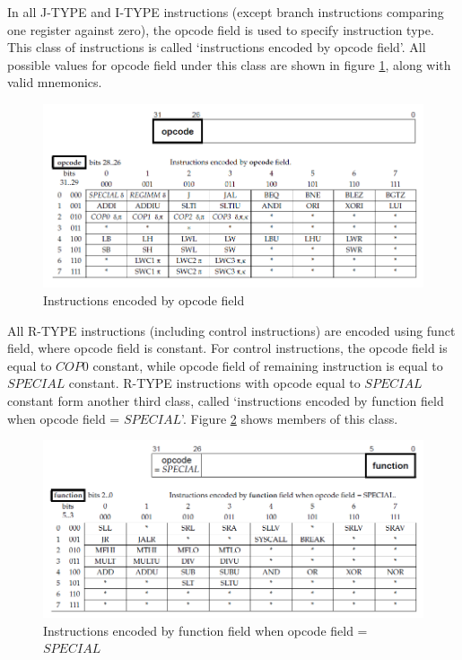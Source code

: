 \documentclass[oneside]{book}
\begin{document}
In all J-TYPE and I-TYPE instructions
(except branch instructions comparing one register against zero),
the opcode field is used to specify instruction type. This class
of instructions is called `instructions encoded by opcode field'.
All possible values for opcode field under this class are shown
in figure \ref{encoding1}, along with valid mnemonics.\\

\begin{figure}[H]
\begin{center}
\includegraphics[width=\textwidth]{encoding1.png}
\end{center}
\caption{Instructions encoded by opcode field}
\label{encoding1}
\end{figure}

All R-TYPE instructions (including control instructions)
are encoded using funct field, where opcode field is constant.
For control instructions, the opcode field is equal to $COP0$ constant,
while opcode field of remaining instruction is equal to $SPECIAL$ constant.
R-TYPE instructions with opcode equal to $SPECIAL$ constant form
another third class, called `instructions encoded by function field
when opcode field = $SPECIAL$'. Figure \ref{encoding2} shows
members of this class.\\

\begin{figure}[H]
\begin{center}
\includegraphics[width=\textwidth]{encoding2.png}
\end{center}
\caption{Instructions encoded by function field when opcode field = $SPECIAL$}
\label{encoding2}
\end{figure}
\end{document}
